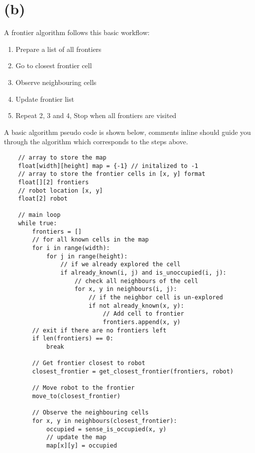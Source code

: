 \documentclass{report}
\begin{document}
\section{(b)}

A frontier algorithm follows this basic workflow:

\begin{enumerate}
    \item Prepare a list of all frontiers
    \item Go to closest frontier cell
    \item Observe neighbouring cells
    \item Update frontier list
    \item Repeat 2, 3 and 4, Stop when all frontiers are visited
\end{enumerate}

A basic algorithm pseudo code is shown below, comments inline should guide you through the algorithm which corresponds to the steps above.


\begin{verbatim}
    // array to store the map
    float[width][height] map = {-1} // initalized to -1
    // array to store the frontier cells in [x, y] format
    float[][2] frontiers
    // robot location [x, y]
    float[2] robot

    // main loop
    while true:
        frontiers = []
        // for all known cells in the map
        for i in range(width):
            for j in range(height):
                // if we already explored the cell
                if already_known(i, j) and is_unoccupied(i, j):
                    // check all neighbours of the cell
                    for x, y in neighbours(i, j):
                        // if the neighbor cell is un-explored
                        if not already_known(x, y):
                            // Add cell to frontier
                            frontiers.append(x, y)
        // exit if there are no frontiers left
        if len(frontiers) == 0:
            break

        // Get frontier closest to robot
        closest_frontier = get_closest_frontier(frontiers, robot)

        // Move robot to the frontier
        move_to(closest_frontier)

        // Observe the neighbouring cells
        for x, y in neighbours(closest_frontier):
            occupied = sense_is_occupied(x, y)
            // update the map
            map[x][y] = occupied
\end{verbatim}
\end{document}
